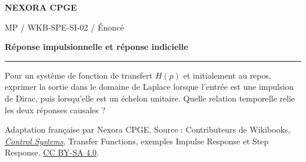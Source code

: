 \documentclass[11pt,a4paper]{article}
\begin{document}
{\small\bfseries\color{nexorablue} NEXORA CPGE}\par
{\small MP / WKB-SPE-SI-02 / Énoncé}\par
{\LARGE\bfseries Réponse impulsionnelle et réponse indicielle}\par
\vspace{0.25em}\hrule\vspace{0.6em}

Pour un système de fonction de transfert $H(p)$ et initialement au repos, exprimer la sortie dans le domaine de Laplace lorsque l’entrée est une impulsion de Dirac, puis lorsqu’elle est un échelon unitaire. Quelle relation temporelle relie les deux réponses causales ?

\bigskip
{\footnotesize Adaptation française par Nexora CPGE. Source : Contributeurs de Wikibooks,
\href{https://en.wikibooks.org/wiki/Control_Systems/Transfer_Functions\#Using_the_Transfer_Function}{\textit{Control Systems}}, Transfer Functions, exemples Impulse Response et Step Response.
\href{https://creativecommons.org/licenses/by-sa/4.0/}{CC BY-SA 4.0}.}
\end{document}
